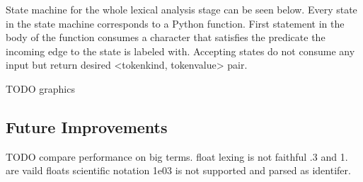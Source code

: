 State machine for the whole lexical analysis stage can be seen below. Every state in the state machine corresponds to a Python function. First statement in the body of the function consumes a character that satisfies the predicate the incoming edge to the state is labeled with. Accepting states do not consume any input but return desired <tokenkind, tokenvalue> pair.


TODO graphics


\subsection{Future Improvements}
TODO compare performance on big terms. 
float lexing is not faithful .3 and 1. are vaild floats
scientific notation 1e03 is not supported and parsed as identifer.

